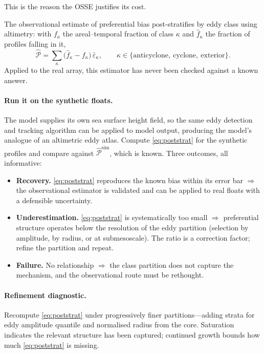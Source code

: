 \documentclass[11pt]{article}
\begin{document}
This is the reason the OSSE justifies its cost.

The observational estimate of preferential bias post-stratifies by eddy class using altimetry:
with $f_\kappa$ the areal--temporal fraction of class $\kappa$ and $\hat{f}_\kappa$ the
fraction of profiles falling in it,
\begin{equation}
  \label{eq:poststrat}
  \widehat{\mathcal{P}} = \sum_{\kappa} \big(\hat{f}_\kappa - f_\kappa\big)\,\bar\varepsilon_\kappa,
  \qquad \kappa \in \{\text{anticyclone},\ \text{cyclone},\ \text{exterior}\}.
\end{equation}
Applied to the real array, this estimator has never been checked against a known answer.

\paragraph{Run it on the synthetic floats.} The model supplies its own sea surface height field,
so the same eddy detection and tracking algorithm can be applied to model output, producing the
model's analogue of an altimetric eddy atlas. Compute \eqref{eq:poststrat} for the synthetic
profiles and compare against $\widehat{\mathcal{P}}^{\text{sim}}$, which is known. Three
outcomes, all informative:

\begin{itemize}[leftmargin=*]
  \item \textbf{Recovery.} \eqref{eq:poststrat} reproduces the known bias within its error bar
        $\Rightarrow$ the observational estimator is validated and can be applied to real floats
        with a defensible uncertainty.
  \item \textbf{Underestimation.} \eqref{eq:poststrat} is systematically too small
        $\Rightarrow$ preferential structure operates below the resolution of the eddy partition
        (selection by amplitude, by radius, or at submesoscale). The ratio is a correction
        factor; refine the partition and repeat.
  \item \textbf{Failure.} No relationship $\Rightarrow$ the class partition does not capture the
        mechanism, and the observational route must be rethought.
\end{itemize}

\paragraph{Refinement diagnostic.} Recompute \eqref{eq:poststrat} under progressively finer
partitions---adding strata for eddy amplitude quantile and normalised radius from the core.
Saturation indicates the relevant structure has been captured; continued growth bounds how much
\eqref{eq:poststrat} is missing.
\end{document}
